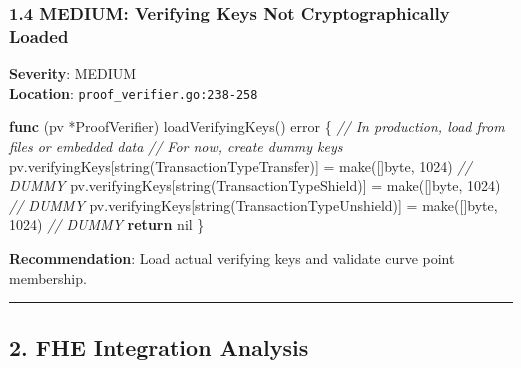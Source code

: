 \documentclass[
]{article}
\newenvironment{Shaded}{}{}
\newcommand{\BuiltInTok}[1]{\textcolor[rgb]{0.00,0.50,0.00}{#1}}
\newcommand{\CommentTok}[1]{\textcolor[rgb]{0.38,0.63,0.69}{\textit{#1}}}
\newcommand{\ControlFlowTok}[1]{\textcolor[rgb]{0.00,0.44,0.13}{\textbf{#1}}}
\newcommand{\DataTypeTok}[1]{\textcolor[rgb]{0.56,0.13,0.00}{#1}}
\newcommand{\DecValTok}[1]{\textcolor[rgb]{0.25,0.63,0.44}{#1}}
\newcommand{\KeywordTok}[1]{\textcolor[rgb]{0.00,0.44,0.13}{\textbf{#1}}}
\newcommand{\NormalTok}[1]{#1}
\newcommand{\OperatorTok}[1]{\textcolor[rgb]{0.40,0.40,0.40}{#1}}
\newcommand{\OtherTok}[1]{\textcolor[rgb]{0.00,0.44,0.13}{#1}}
\begin{document}
\subsubsection{1.4 MEDIUM: Verifying Keys Not Cryptographically
Loaded}\label{14-medium-verifying-keys-not-cryptographically-loaded}

\textbf{Severity}: MEDIUM\\
\textbf{Location}: \texttt{proof\_verifier.go:238-258}

\begin{Shaded}
\begin{Highlighting}[]
\KeywordTok{func} \OperatorTok{(}\NormalTok{pv }\OperatorTok{*}\NormalTok{ProofVerifier}\OperatorTok{)}\NormalTok{ loadVerifyingKeys}\OperatorTok{()} \DataTypeTok{error} \OperatorTok{\{}
    \CommentTok{// In production, load from files or embedded data}
    \CommentTok{// For now, create dummy keys}
\NormalTok{    pv}\OperatorTok{.}\NormalTok{verifyingKeys}\OperatorTok{[}\DataTypeTok{string}\OperatorTok{(}\NormalTok{TransactionTypeTransfer}\OperatorTok{)]} \OperatorTok{=} \BuiltInTok{make}\OperatorTok{([]}\DataTypeTok{byte}\OperatorTok{,} \DecValTok{1024}\OperatorTok{)}  \CommentTok{// DUMMY}
\NormalTok{    pv}\OperatorTok{.}\NormalTok{verifyingKeys}\OperatorTok{[}\DataTypeTok{string}\OperatorTok{(}\NormalTok{TransactionTypeShield}\OperatorTok{)]} \OperatorTok{=} \BuiltInTok{make}\OperatorTok{([]}\DataTypeTok{byte}\OperatorTok{,} \DecValTok{1024}\OperatorTok{)}    \CommentTok{// DUMMY}
\NormalTok{    pv}\OperatorTok{.}\NormalTok{verifyingKeys}\OperatorTok{[}\DataTypeTok{string}\OperatorTok{(}\NormalTok{TransactionTypeUnshield}\OperatorTok{)]} \OperatorTok{=} \BuiltInTok{make}\OperatorTok{([]}\DataTypeTok{byte}\OperatorTok{,} \DecValTok{1024}\OperatorTok{)}  \CommentTok{// DUMMY}
    \ControlFlowTok{return} \OtherTok{nil}
\OperatorTok{\}}
\end{Highlighting}
\end{Shaded}

\textbf{Recommendation}: Load actual verifying keys and validate curve
point membership.

\begin{center}\rule{0.5\linewidth}{0.5pt}\end{center}

\subsection{2. FHE Integration
Analysis}\label{2-fhe-integration-analysis}
\end{document}
